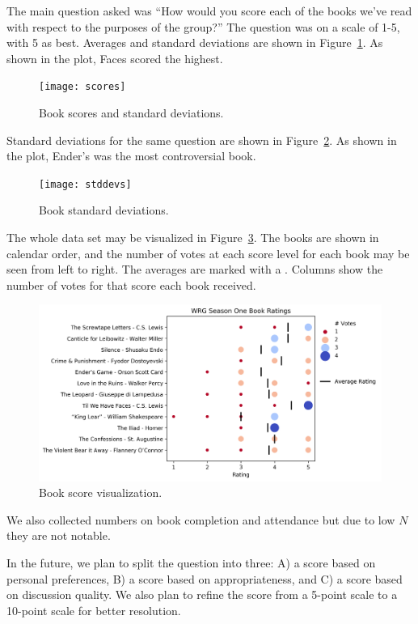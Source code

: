 \documentclass{article}
\newcommand{\PLOT}[1]{Figure~\ref{plot:#1}}
\begin{document}
The main question asked was ``How would you score each of the books we've read with respect to the purposes of the group?''  The question was on a scale of 1-5, with 5 as best.  Averages and standard deviations are shown in \PLOT{scores}.  As shown in the plot, Faces scored the highest.

\newcommand{\plotwidth}{0.9}

\begin{figure}
\texttt{[image: scores]}
\caption{Book scores and standard deviations.
  \label{plot:scores}}
\end{figure}

Standard deviations for the same question are shown in \PLOT{stddevs}.  As shown in the plot, Ender's was the most controversial book.

\begin{figure}
\texttt{[image: stddevs]}
\caption{Book standard deviations.
  \label{plot:stddevs}}
\end{figure}

The whole data set may be visualized in \PLOT{viz}.  The books are shown in calendar order, and the number of votes at each score level for each book may be seen from left to right.  The averages are marked with a \pmb{\textbar}.  Columns show the number of votes for that score each book received.

\begin{figure}
\includegraphics[width=\plotwidth\columnwidth]{viz}
\caption{Book score visualization.
  \label{plot:viz}}
\end{figure}

We also collected numbers on book completion and attendance but due to low $N$ they are not notable.

\newpage

In the future, we plan to split the question into three: A) a score based on personal preferences, B) a score based on appropriateness, and C) a score based on discussion quality.  We also plan to refine the score from a 5-point scale to a 10-point scale for better resolution.
\end{document}
